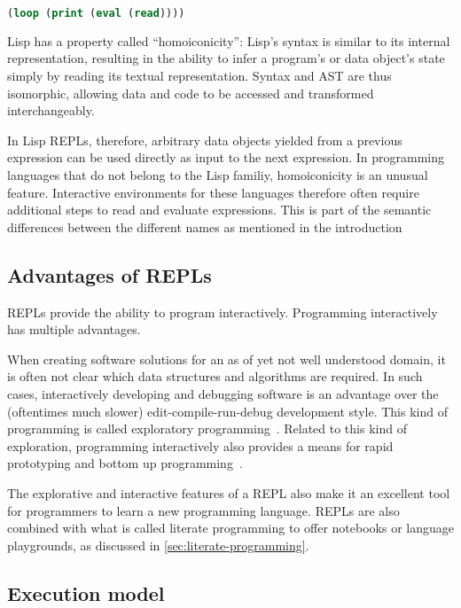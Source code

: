 \begin{lstlisting}[language=lisp]
(loop (print (eval (read))))
\end{lstlisting}

Lisp has a property called ``homoiconicity'': Lisp's syntax is similar to
its internal representation, resulting in the ability to infer a program's or
data object's state simply by reading its textual representation. Syntax and AST
are thus isomorphic, allowing data and code to be accessed and transformed
interchangeably.

In Lisp REPLs, therefore, arbitrary data objects yielded from a previous
expression can be used directly as input to the next expression. In programming
languages that do not belong to the Lisp familiy, homoiconicity is an unusual
feature. Interactive environments for these languages therefore often require
additional steps to read and evaluate expressions. This is part of the semantic
differences between the different names as mentioned in the introduction

\subsection{Advantages of REPLs}
\label{ssec:repl-advantages}

REPLs provide the ability to program interactively. Programming interactively
has multiple advantages.

When creating software solutions for an as of yet not well understood domain, it
is often not clear which data structures and algorithms are required. In such
cases, interactively developing and debugging software is an advantage over the
(oftentimes much slower) edit-compile-run-debug development style. This kind of
programming is called exploratory programming~\cite{Fritzson86}. Related to this
kind of exploration, programming interactively also provides a means for rapid
prototyping and bottom up programming~\cite{Graham93}.

The explorative and interactive features of a REPL also make it an excellent
tool for programmers to learn a new programming language. REPLs are also
combined with what is called literate programming to offer notebooks or language
playgrounds, as discussed in \cref{sec:literate-programming}.

\subsection{Execution model}
\label{ssec:execution-model}

